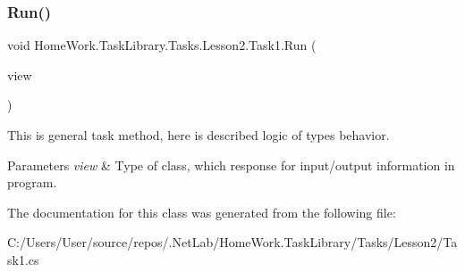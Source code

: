\subsubsection{\texorpdfstring{Run()}{Run()}}
{\footnotesize\ttfamily void Home\+Work.\+Task\+Library.\+Tasks.\+Lesson2.\+Task1.\+Run (\begin{DoxyParamCaption}\item[{I\+Information}]{view }\end{DoxyParamCaption})}



This is general task method, here is described logic of types behavior. 


\begin{DoxyParams}{Parameters}
{\em view} & Type of class, which response for input/output information in program.\\
\hline
\end{DoxyParams}


The documentation for this class was generated from the following file\+:\begin{DoxyCompactItemize}
\item 
C\+:/\+Users/\+User/source/repos/.\+Net\+Lab/\+Home\+Work.\+Task\+Library/\+Tasks/\+Lesson2/Task1.\+cs\end{DoxyCompactItemize}
